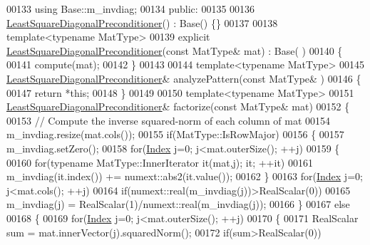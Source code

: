 \begin{DoxyCode}
00133     \textcolor{keyword}{using} Base::m\_invdiag;
00134   \textcolor{keyword}{public}:
00135 
00136     \hyperlink{group___iterative_linear_solvers___module_class_eigen_1_1_least_square_diagonal_preconditioner}{LeastSquareDiagonalPreconditioner}() : Base() \{\}
00137 
00138     \textcolor{keyword}{template}<\textcolor{keyword}{typename} MatType>
00139     \textcolor{keyword}{explicit} \hyperlink{group___iterative_linear_solvers___module_class_eigen_1_1_least_square_diagonal_preconditioner}{LeastSquareDiagonalPreconditioner}(\textcolor{keyword}{const} MatType& mat) : Base(
      )
00140     \{
00141       compute(mat);
00142     \}
00143 
00144     \textcolor{keyword}{template}<\textcolor{keyword}{typename} MatType>
00145     \hyperlink{group___iterative_linear_solvers___module_class_eigen_1_1_least_square_diagonal_preconditioner}{LeastSquareDiagonalPreconditioner}& analyzePattern(\textcolor{keyword}{const} MatType& )
00146     \{
00147       \textcolor{keywordflow}{return} *\textcolor{keyword}{this};
00148     \}
00149     
00150     \textcolor{keyword}{template}<\textcolor{keyword}{typename} MatType>
00151     \hyperlink{group___iterative_linear_solvers___module_class_eigen_1_1_least_square_diagonal_preconditioner}{LeastSquareDiagonalPreconditioner}& factorize(\textcolor{keyword}{const} MatType& mat)
00152     \{
00153       \textcolor{comment}{// Compute the inverse squared-norm of each column of mat}
00154       m\_invdiag.resize(mat.cols());
00155       \textcolor{keywordflow}{if}(MatType::IsRowMajor)
00156       \{
00157         m\_invdiag.setZero();
00158         \textcolor{keywordflow}{for}(\hyperlink{namespace_eigen_a62e77e0933482dafde8fe197d9a2cfde}{Index} j=0; j<mat.outerSize(); ++j)
00159         \{
00160           \textcolor{keywordflow}{for}(\textcolor{keyword}{typename} MatType::InnerIterator it(mat,j); it; ++it)
00161             m\_invdiag(it.index()) += numext::abs2(it.value());
00162         \}
00163         \textcolor{keywordflow}{for}(\hyperlink{namespace_eigen_a62e77e0933482dafde8fe197d9a2cfde}{Index} j=0; j<mat.cols(); ++j)
00164           \textcolor{keywordflow}{if}(numext::real(m\_invdiag(j))>RealScalar(0))
00165             m\_invdiag(j) = RealScalar(1)/numext::real(m\_invdiag(j));
00166       \}
00167       \textcolor{keywordflow}{else}
00168       \{
00169         \textcolor{keywordflow}{for}(\hyperlink{namespace_eigen_a62e77e0933482dafde8fe197d9a2cfde}{Index} j=0; j<mat.outerSize(); ++j)
00170         \{
00171           RealScalar sum = mat.innerVector(j).squaredNorm();
00172           \textcolor{keywordflow}{if}(sum>RealScalar(0))

\end{DoxyCode}
